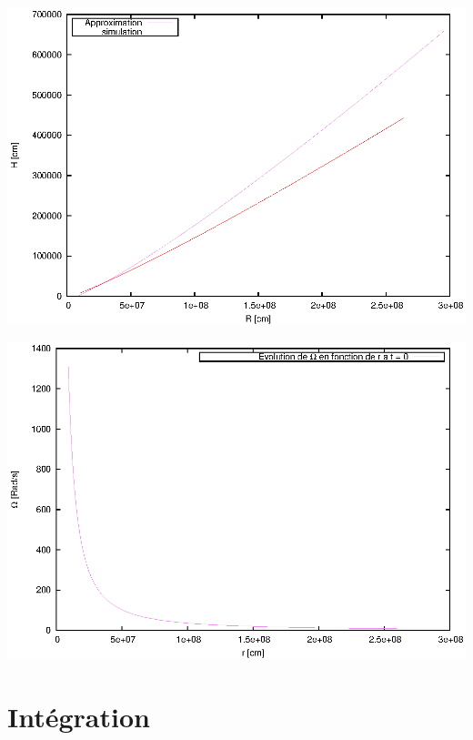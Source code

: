 \documentclass[french]{beamer}
\begin{document}
\begin{frame}
	\begin{center}
		\includegraphics[scale=0.7]{ic_h.eps}
	\end{center}
\end{frame}

\begin{frame}
	\begin{center}
		\includegraphics[scale=0.7]{Omega.eps}
	\end{center}
\end{frame}



\section{Intégration}
\end{document}
